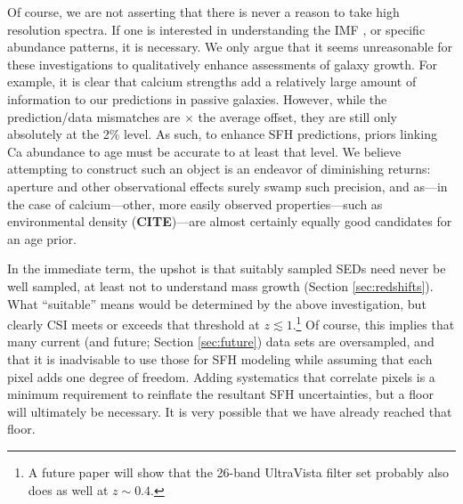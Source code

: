 \documentclass[a4paper,fleqn,usenatbib]{mnras}
\newcommand{\bfr}{\bf\color{red}}
\newcommand{\CITE}{{\bfr CITE}}
\begin{document}

Of course, we are not asserting that there is never a reason to take high resolution spectra. If 
one is interested in understanding the IMF \citep{Conroy12}, or specific abundance 
patterns, it is necessary. We only argue that it seems unreasonable for these investigations to
qualitatively enhance assessments of galaxy growth. For example, it is clear that calcium strengths
add a relatively large amount of information to our predictions in passive galaxies. However,
while the prediction/data mismatches are $\times$ the average offset, they are still only absolutely
at the 2\% level. As such, to enhance SFH predictions, priors linking Ca abundance to age must 
be accurate to at least that level. We believe attempting to construct such an object is an endeavor 
of diminishing returns: aperture and other observational effects surely swamp such precision, and
 as---in the case of calcium---other, more easily observed properties---such as environmental 
 density (\CITE)---are almost certainly equally good candidates for an age prior.



In the immediate term, the upshot is that suitably sampled SEDs need never be well sampled, at least
not to understand mass growth (Section \ref{sec:redshifts}). What ``suitable'' means would be determined 
by the above investigation, but clearly CSI meets or exceeds that threshold at $z\lesssim1$.\footnote{A future 
paper will show that the 26-band UltraVista filter set \citep{Muzzin13} probably also does as well at 
$z\sim0.4$.} Of course, this implies that many current (and future; Section \ref{sec:future}) data sets 
are oversampled, and that it is inadvisable to use those for SFH modeling while assuming that each 
pixel adds one degree of freedom. Adding systematics that correlate pixels is a minimum requirement 
to reinflate the resultant SFH uncertainties, but a floor will ultimately be necessary. It is very possible 
that we have already reached that floor.
\fi
\end{document}

